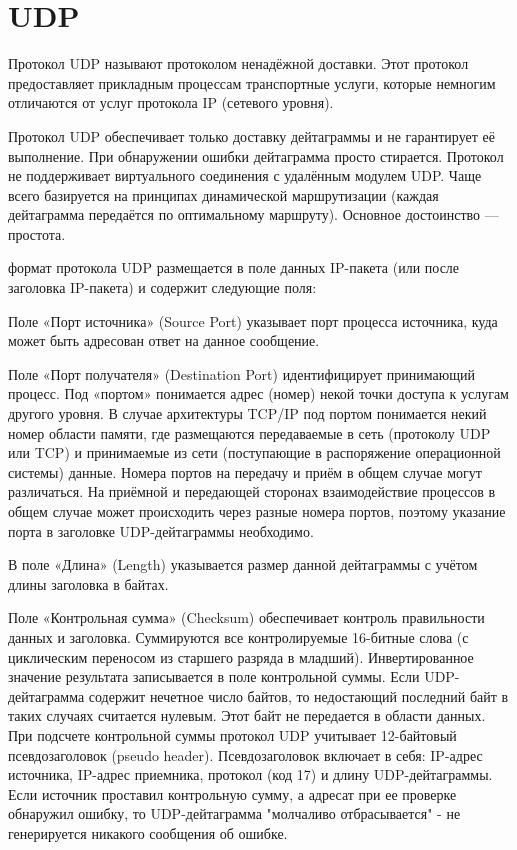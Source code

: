 \documentclass[12pt,a4paper]{report}
\begin{document}
\section{UDP}
	Протокол UDP называют протоколом ненадёжной доставки. Этот протокол предоставляет прикладным процессам транспортные услуги, которые немногим отличаются от услуг протокола IP (сетевого уровня).

      Протокол UDP обеспечивает только доставку дейтаграммы и не гарантирует её выполнение. При обнаружении ошибки дейтаграмма просто стирается. Протокол не поддерживает виртуального соединения с удалённым модулем UDP. Чаще всего базируется на принципах динамической маршрутизации (каждая дейтаграмма передаётся по оптимальному маршруту). Основное достоинство — простота.

формат протокола UDP размещается в поле данных IP-пакета (или после заголовка IP-пакета) и содержит следующие поля:

      Поле «Порт источника» (Source Port) указывает порт процесса источника, куда может быть адресован ответ на данное сообщение.

      Поле «Порт получателя» (Destination Port) идентифицирует принимающий процесс.
Под «портом» понимается адрес (номер) некой точки доступа к услугам другого уровня. В случае архитектуры TCP/IP под портом понимается некий номер области памяти, где размещаются передаваемые в сеть (протоколу UDP или TCP) и принимаемые из сети (поступающие в распоряжение операционной системы) данные. Номера портов на передачу и приём в общем случае могут различаться. На приёмной и передающей сторонах взаимодействие процессов в общем случае может происходить через разные номера портов, поэтому указание порта в заголовке UDP-дейтаграммы необходимо.

      В поле «Длина» (Length) указывается размер данной дейтаграммы с учётом длины заголовка в байтах.

      Поле «Контрольная сумма» (Checksum) обеспечивает контроль правильности данных и заголовка. Суммируются все контролируемые 16-битные слова (с циклическим переносом из старшего разряда в младший). Инвертированное значение результата записывается в поле контрольной суммы. Если UDP-дейтаграмма содержит нечетное число байтов, то недостающий последний байт в таких случаях считается нулевым. Этот байт не передается в области данных. 
При подсчете контрольной суммы протокол UDP учитывает 12-байтовый псевдозаголовок (pseudo header). Псевдозаголовок включает в себя: IP-адрес источника, IP-адрес приемника, протокол (код 17) и длину UDP-дейтаграммы.
Если источник проставил контрольную сумму, а адресат при ее проверке обнаружил ошибку, то UDP-дейтаграмма "молчаливо отбрасывается" - не генерируется никакого сообщения об ошибке.
\end{document}
